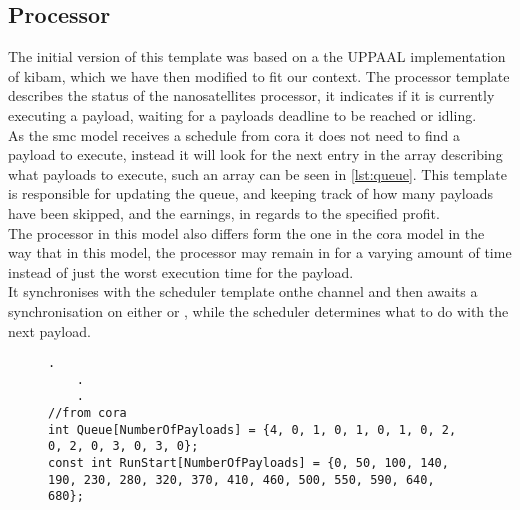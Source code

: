 \subsection{Processor}
The initial version of this template was based on a the UPPAAL implementation of \gls{kibam}, which we have then modified to fit our context. The processor template describes the status of the nanosatellites processor, it indicates if it is currently executing a payload, waiting for a payloads deadline to be reached or idling.\\
As the \gls{smc} model receives a schedule from \gls{cora} it does not need to find a payload to execute, instead it will look for the next entry in the array describing what payloads to execute, such an array can be seen in \cref{lst:queue}. This template is responsible for updating the queue, and keeping track of how many payloads have been skipped, and the earnings, in regards to the specified profit.\\
The processor in this model also differs form the one in the \gls{cora} model in the way that in this model, the processor may remain in  for a varying amount of time instead of just the worst execution time for the payload.\\
It synchronises with the scheduler template onthe channel  and then awaits a synchronisation on either  or , while the scheduler determines what to do with the next payload.
\begin{figure}[h]
	\begin{lstlisting}[language=my_c, caption={Payload queue with start times, extracted from the \gls{cora} model}, label=lst:queue, firstnumber=53]
	.
	.
	.
//from cora
int Queue[NumberOfPayloads] = {4, 0, 1, 0, 1, 0, 1, 0, 2, 0, 2, 0, 3, 0, 3, 0};
const int RunStart[NumberOfPayloads] = {0, 50, 100, 140, 190, 230, 280, 320, 370, 410, 460, 500, 550, 590, 640, 680};
	\end{lstlisting}
\end{figure}




